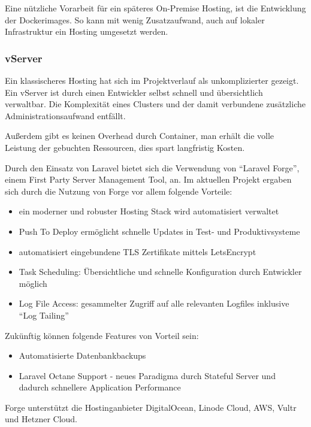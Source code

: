 Eine nützliche Vorarbeit für ein späteres On-Premise Hosting, ist die Entwicklung der Dockerimages.
So kann mit wenig Zusatzaufwand, auch auf lokaler Infrastruktur ein Hosting umgesetzt werden.
\newpage

\subsubsection{vServer}
Ein klassischeres Hosting hat sich im Projektverlauf als unkomplizierter gezeigt.
Ein vServer ist durch einen Entwickler selbst schnell und übersichtlich verwaltbar.
Die Komplexität eines Clusters und der damit verbundene zusätzliche Administrationsaufwand entfällt.

Außerdem gibt es keinen Overhead durch Container, man erhält die volle Leistung der gebuchten Ressourcen, dies spart langfristig Kosten.

Durch den Einsatz von Laravel bietet sich die Verwendung von \enquote{Laravel Forge}\cite{laravel-forge}, einem First Party Server Management Tool, an.
Im aktuellen Projekt ergaben sich durch die Nutzung von Forge vor allem folgende Vorteile:
\begin{itemize}
    \item ein moderner und robuster Hosting Stack wird automatisiert verwaltet
    \item Push To Deploy ermöglicht schnelle Updates in Test- und Produktivsysteme
    \item automatisiert eingebundene TLS Zertifikate mittels LetsEncrypt
    \item Task Scheduling: Übersichtliche und schnelle Konfiguration durch Entwickler möglich
    \item Log File Access: gesammelter Zugriff auf alle relevanten Logfiles inklusive \enquote{Log Tailing}
\end{itemize}

Zukünftig können folgende Features von Vorteil sein:
\begin{itemize}
    \item Automatisierte Datenbankbackups
    \item Laravel Octane Support - neues Paradigma durch Stateful Server und dadurch schnellere Application Performance\cite{laravel-octane}
\end{itemize}

Forge unterstützt die Hostinganbieter DigitalOcean, Linode Cloud, AWS, Vultr und Hetzner Cloud.

